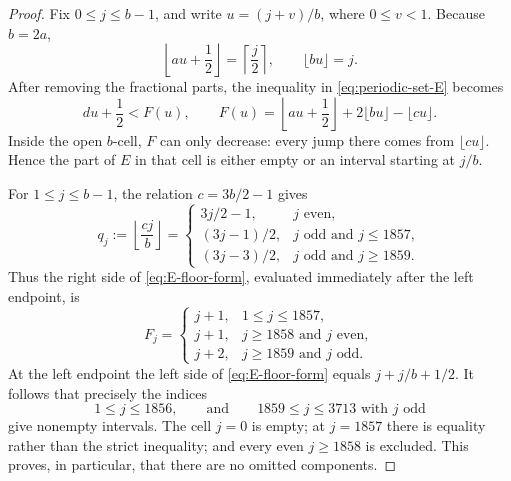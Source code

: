 \documentclass[11pt,reqno,letterpaper]{amsart}
\numberwithin{equation}{section}
\theoremstyle{definition}
\theoremstyle{remark}
\begin{document}
\begin{proof}
Fix \(0\leq j\leq b-1\), and write
\(u=(j+v)/b\), where \(0\leq v<1\).  Because \(b=2a\),
\[
 \left\lfloor au+\frac12\right\rfloor=\left\lceil\frac j2\right\rceil,
 \qquad \lfloor bu\rfloor=j.
\]
After removing the fractional parts, the inequality in
\eqref{eq:periodic-set-E} becomes
\begin{equation}\label{eq:E-floor-form}
 du+\frac12<F(u),\qquad
 F(u)=\left\lfloor au+\frac12\right\rfloor
       +2\lfloor bu\rfloor-\lfloor cu\rfloor.
\end{equation}
Inside the open \(b\)-cell, \(F\) can only decrease: every jump there
comes from \(\lfloor cu\rfloor\).  Hence the part of \(E\) in that cell
is either empty or an interval starting at \(j/b\).

For \(1\leq j\leq b-1\), the relation \(c=3b/2-1\) gives
\begin{equation}\label{eq:qj-table}
 q_j:=\left\lfloor\frac{cj}{b}\right\rfloor
 =\begin{cases}
  3j/2-1,&j\text{ even},\\
  (3j-1)/2,&j\text{ odd and }j\leq1857,\\
  (3j-3)/2,&j\text{ odd and }j\geq1859.
 \end{cases}
\end{equation}
Thus the right side of \eqref{eq:E-floor-form}, evaluated immediately
after the left endpoint, is
\begin{equation}\label{eq:Fj-table}
 F_j=\begin{cases}
  j+1,&1\leq j\leq1857,\\
  j+1,&j\geq1858\text{ and }j\text{ even},\\
  j+2,&j\geq1859\text{ and }j\text{ odd}.
 \end{cases}
\end{equation}
At the left endpoint the left side of \eqref{eq:E-floor-form} equals
\(j+j/b+1/2\).  It follows that precisely the indices
\begin{equation}\label{eq:active-j-indices}
 1\leq j\leq1856,\qquad\text{and}\qquad
 1859\leq j\leq3713\text{ with }j\text{ odd}
\end{equation}
give nonempty intervals.  The cell \(j=0\) is empty; at \(j=1857\)
there is equality rather than the strict inequality; and every even
\(j\geq1858\) is excluded.  This proves, in particular, that there are
no omitted components.


\end{proof}
\end{document}
